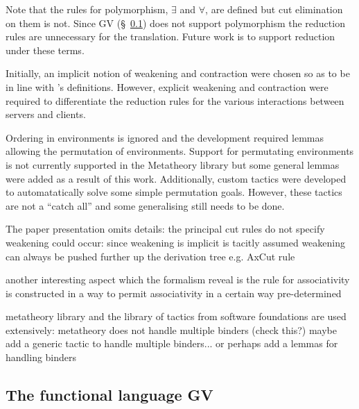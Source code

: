Note that the rules for polymorphism, $\exists$ and $\forall$, are defined but
cut elimination on them is not. Since GV (\S~\ref{sec:gv}) does not support
polymorphism the reduction rules are unnecessary for the translation. Future
work is to support reduction under these terms.

Initially, an implicit notion of weakening and contraction were chosen so as
to be in line with \citeauthor{Wadler:2014}'s definitions. However, explicit
weakening and contraction were required to differentiate the reduction rules
for the various interactions between servers and clients.

Ordering in environments is ignored and the development required lemmas
allowing the permutation of environments. Support for permutating environments
is not currently supported in the Metatheory library but some general lemmas
were added as a result of this work. Additionally, custom tactics were
developed to automatatically solve some simple permutation goals. However,
these tactics are not a ``catch all'' and some generalising still needs to be
done.

The paper presentation omits details: the principal cut rules do not specify
weakening could occur: since weakening is implicit is tacitly assumed
weakening can always be pushed further up the derivation tree e.g. AxCut rule

another interesting aspect which the formalism reveal is the rule for
associativity is constructed in a way to permit associativity in a certain way
pre-determined

metatheory library and the library of tactics from software foundations are
used extensively: metatheory does not handle multiple binders (check this?)
maybe add a generic tactic to handle multiple binders... or perhaps add a
lemmas for handling binders

\subsection{The functional language GV}\label{sec:gv}

\begin{comment}
FIGURES

types

terms

typing judgements
\end{comment}

